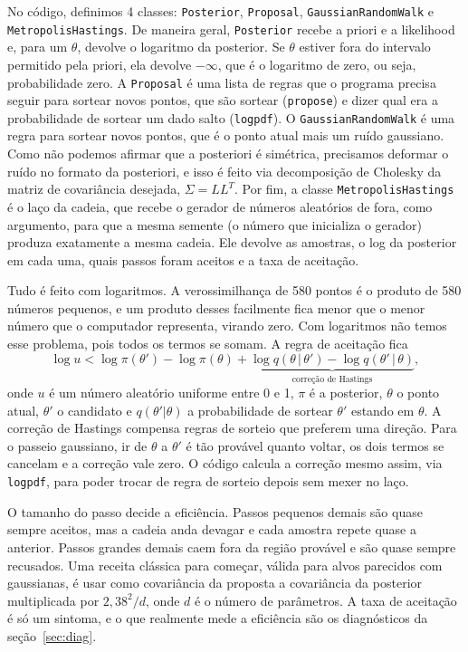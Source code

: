 \documentclass[11pt,a4paper]{article}
\begin{document}
No código, definimos 4 classes: \texttt{Posterior}, \texttt{Proposal}, \texttt{GaussianRandomWalk} e \texttt{MetropolisHastings}.
De maneira geral, \texttt{Posterior} recebe a priori e a likelihood e, para um $\theta$, devolve o logaritmo da posterior. 
Se $\theta$ estiver fora do intervalo permitido pela priori, ela devolve $-\infty$, que é o logaritmo de zero, ou seja, probabilidade zero. 
A \texttt{Proposal} é uma lista de regras que o programa precisa seguir para sortear novos pontos, que são 
sortear (\texttt{propose}) e dizer qual era a probabilidade de sortear um dado salto (\texttt{logpdf}).
O \texttt{GaussianRandomWalk} é uma regra para sortear novos pontos, que é o ponto atual mais um ruído gaussiano. Como
não podemos afirmar que a posteriori é simétrica, precisamos deformar o ruído no 
formato da posteriori, e isso é feito via decomposição de Cholesky da matriz de covariância desejada,
$\Sigma=L L^T$.
Por fim, a classe \texttt{MetropolisHastings} é o laço da cadeia, que recebe o gerador de números aleatórios de fora, como argumento, para que a mesma semente (o número que inicializa o gerador) produza exatamente a mesma cadeia. Ele devolve as amostras, o log da posterior em cada uma, quais passos foram aceitos e a taxa de aceitação.


Tudo é feito com logaritmos. A verossimilhança de 580
pontos é o produto de 580 números pequenos, e um produto desses facilmente fica
menor que o menor número que o computador representa,
virando zero. Com logaritmos não temos esse problema, pois todos os termos se somam. 
A regra de
aceitação fica
\begin{equation}
\log u < \log\pi(\theta') - \log\pi(\theta)
+ \underbrace{\log q(\theta\,|\,\theta') - \log q(\theta'\,|\,\theta)}_{\text{correção de Hastings}},
\end{equation}
onde $u$ é um número aleatório uniforme entre 0 e 1, $\pi$ é a posterior, $\theta$ o ponto atual, $\theta'$ o candidato e
$q(\theta'|\theta)$ a probabilidade de sortear $\theta'$ estando em $\theta$. A
correção de Hastings compensa regras de sorteio que preferem uma direção.
Para o passeio gaussiano, ir de $\theta$ a $\theta'$ é tão provável quanto
voltar, os dois termos se cancelam e a correção vale zero. O código calcula a
correção mesmo assim, via \texttt{logpdf}, para poder trocar de regra de sorteio
depois sem mexer no laço.

O tamanho do passo decide a eficiência. Passos pequenos demais são quase sempre
aceitos, mas a cadeia anda devagar e cada amostra repete quase a anterior.
Passos grandes demais caem fora da região provável e são quase sempre
recusados. Uma receita clássica para começar, válida para alvos parecidos com
gaussianas, é usar como covariância da proposta a covariância da posterior
multiplicada por $2{,}38^2/d$, onde $d$ é o número de parâmetros. A taxa de
aceitação é só um sintoma, e o que realmente mede a eficiência são os
diagnósticos da seção~\ref{sec:diag}.
\end{document}
